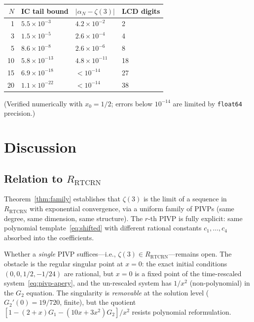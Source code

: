 \documentclass[11pt]{article}
\newcommand{\RTCRN}{R_{\mathrm{RTCRN}}}
\begin{document}
\medskip
\begin{center}
\begin{tabular}{rlll}
\hline
$N$ & IC tail bound & $|\alpha_N - \zeta(3)|$ & LCD digits \\
\hline
1 & $5.5 \times 10^{-3}$ & $4.2 \times 10^{-2}$ & 2 \\
3 & $1.5 \times 10^{-5}$ & $2.6 \times 10^{-4}$ & 4 \\
5 & $8.6 \times 10^{-8}$ & $2.6 \times 10^{-6}$ & 8 \\
10 & $5.8 \times 10^{-13}$ & $4.8 \times 10^{-11}$ & 18 \\
15 & $6.9 \times 10^{-18}$ & $< 10^{-14}$ & 27 \\
20 & $1.1 \times 10^{-22}$ & $< 10^{-14}$ & 38 \\
\hline
\end{tabular}
\end{center}
\medskip\noindent
(Verified numerically with $x_0 = 1/2$;
errors below $10^{-14}$ are limited by \texttt{float64} precision.)

\section{Discussion}

\subsection{Relation to $\RTCRN$}

Theorem~\ref{thm:family} establishes that $\zeta(3)$ is the limit
of a sequence in~$\RTCRN$ with exponential convergence,
via a uniform family of PIVPs (same degree, same dimension, same structure).
The $r$-th PIVP is fully explicit: same polynomial template~\eqref{eq:shifted}
with different rational constants $c_1, \ldots, c_4$ absorbed into the coefficients.

Whether a \emph{single} PIVP suffices---i.e., $\zeta(3) \in \RTCRN$---remains open.
The obstacle is the regular singular point at $x = 0$:
the exact initial conditions $(0, 0, 1/2, -1/24)$ are rational,
but $x = 0$ is a fixed point of the time-rescaled system~\eqref{eq:pivp-apery},
and the un-rescaled system has $1/x^2$ (non-polynomial) in the $G_2$ equation.
The singularity is \emph{removable} at the solution level
($G_2'(0) = 19/720$, finite),
but the quotient $[1 - (2{+}x)G_1 - (10x{+}3x^2)G_2]/x^2$
resists polynomial reformulation.
\end{document}
